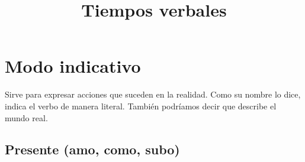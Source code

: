 \documentclass[14pt]{extarticle}
\title{\vspace*{-2cm}Tiempos verbales \vspace{-5ex}}
\begin{document}
\maketitle

\section{Modo indicativo}

Sirve para expresar acciones que suceden en la realidad. Como su nombre lo dice, indica el verbo de manera literal. También podríamos decir que describe el mundo real.

\subsection{Presente (amo, como, subo)}
\end{document}

